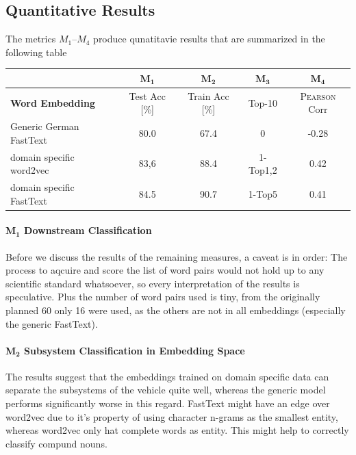 \documentclass[10pt,a4paper]{article}
\begin{document}
\subsection{Quantitative Results}
	The metrics \textbf{$M_1$}--\textbf{$M_4$} produce qunatitavie results that are summarized in the following table 
	
	\begin{center}
		\begin{tabular}{|l| c| c| c|c|}
			
			\hline
			
			 & $\boldsymbol{M_1}$ & $\boldsymbol{M_2}$ & $\boldsymbol{M_3}$ & $\boldsymbol{M_4}$\\ \hline
			
			\textbf{Word Embedding} & Test Acc [\%]& Train Acc [\%] & Top-10 & \textsc{Pearson} Corr \\ \hline
		    Generic German FastText   & 80.0 & 67.4 & 0 & -0.28\\  \hline
			
			domain specific word2vec  & 83,6 & 88.4 & 1-Top1,2 & 0.42\\  \hline
			
			domain specific FastText  & 84.5 & 90.7 & 1-Top5  & 0.41\\ \hline 
		
		\end{tabular}
	\end{center}

\paragraph{$\boldsymbol{M_1}$ Downstream Classification}

Before we discuss the results of the remaining measures, a caveat is in order: The process to aqcuire and score the list of word pairs would not hold up to any scientific standard whatsoever, so every interpretation of the results is speculative. Plus the number of word pairs used is tiny, from the originally planned 60 only 16 were used, as the others are not in all embeddings (especially the generic FastText). 

\paragraph{$\boldsymbol{M_2}$ Subsystem Classification in Embedding Space} The results suggest that the embeddings trained on domain specific data can separate the subsystems of the vehicle quite well, whereas the generic model performs significantly worse in this regard. FastText might have an edge over word2vec due to it's property of using character n-grams as the smallest entity, whereas word2vec only hat complete words as entity. This might help to correctly classify compund nouns. 
\end{document}
